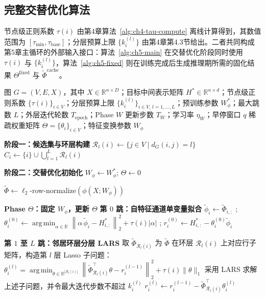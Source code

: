 \subsection{完整交替优化算法}
\label{subsec:ch5-mainloop}
节点级正则系数 $\tau(i)$ 由第4章算法~\ref{alg:ch4-tau-compute} 离线计算得到，其数值范围为 $[\tau_{\min},\tau_{\text{base}}]$；分层预算上限 $\{k_i^{(l)}\}$ 由第4章第4.3节给出。二者共同构成第5章主循环的外部输入接口：算法~\ref{alg:ch5-main} 在交替优化阶段同时使用 $\tau(i)$ 与 $\{k_i^{(l)}\}$，算法~\ref{alg:ch5-fixed} 则在训练完成后生成推理期所需的固化结果 $\Theta^{\text{fixed}}$ 与 $\tilde{\Phi}^{\text{cache}}$。

\begin{algorithm}[tp]
\caption{MSAS-GNN三维自适应稀疏分解主循环（完整交替优化版）}
\label{alg:ch5-main}
\begin{algorithmic}[1]
\setlength{\algorithmicindent}{2em}
\REQUIRE 图 $G=(V,E,X)$，其中 $X\in\mathbb{R}^{n\times D}$；目标中间表示矩阵 $H^*\in\mathbb{R}^{n\times d}$；节点级正则系数 $\{\tau(i)\}_{i\in V}$；分层预算上限 $\{k_i^{(l)}\}_{i\in V,\,l=1,\ldots,L}$；预训练参数 $W_\phi^*$；最大跳数 $L$；外层迭代轮数 $T_{\text{epoch}}$；Phase $W$ 更新步数 $T_W$；学习率 $\eta_W$；早停窗口 $q$
\ENSURE 稀疏权重矩阵 $\Theta=\{\theta_i\}_{i\in V}$；特征变换参数 $W_\phi$

\STATE \textbf{阶段一：候选集与环层构建}
    \STATE $\mathcal{R}_l(i)\leftarrow \{j\in V\mid d_G(i,j)=l\}$ 
  \ENDFOR
  \STATE $C_i\leftarrow \{i\}\cup\bigcup_{l=1}^{L}\mathcal{R}_l(i)$ 
\ENDFOR

\STATE \textbf{阶段二：交替优化初始化}
\STATE $W_\phi\leftarrow W_\phi^*$; $\Theta\leftarrow 0$

  \STATE $\tilde{\Phi}\leftarrow \ell_2$-row-normalize$(\phi(X;W_\phi))$

  \STATE \textbf{Phase $\Theta$：固定 $W_\phi$，更新 $\Theta$}
    \STATE \textbf{第 $0$ 跳：自特征通道单变量拟合}
    \STATE $\tilde{\phi}_i\leftarrow \tilde{\Phi}_{i,:}$
    ; $\theta_i^{(0)}\leftarrow
      \operatorname*{arg\,min}_{\alpha\in\mathbb{R}}
      \left\|
      \alpha\,\tilde{\phi}_i-H_{i,:}^{*}
      \right\|_2^2+\tau(i)|\alpha|$
    ; $r_i^{(0)}\leftarrow H_{i,:}^{*}-\theta_i^{(0)}\tilde{\phi}_i$

    \STATE \textbf{第 $1$ 至 $L$ 跳：邻居环层分层 LARS}
      \STATE 取 $\tilde{\Phi}_{\mathcal{R}_l(i)}$ 为 $\tilde{\Phi}$ 在环层 $\mathcal{R}_l(i)$ 上对应行子矩阵，构造第 $l$ 层 Lasso 子问题：
      \STATE \vspace{-1em} \hspace{2em} $\displaystyle
      \theta_i^{(l)}
      =
      \operatorname*{arg\,min}_{\theta\in\mathbb{R}^{|\mathcal{R}_l(i)|}}
      \left\|
      \tilde{\Phi}_{\mathcal{R}_l(i)}^{\top}\theta-r_i^{(l-1)}
      \right\|_2^2+\tau(i)\|\theta\|_1$
      \STATE 采用 LARS 求解上述子问题，并令最大迭代步数不超过 $k_i^{(l)}$
      \STATE $r_i^{(l)}\leftarrow r_i^{(l-1)}-\tilde{\Phi}_{\mathcal{R}_l(i)}^{\top}\theta_i^{(l)}$
    \ENDFOR


\end{algorithmic}
\end{algorithm}
